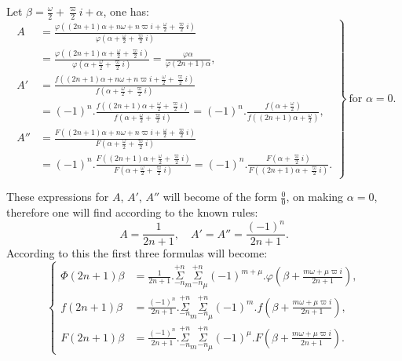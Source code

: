 \documentclass{article}
\begin{document}

Let $\beta=\frac{\omega}{2}+\frac{\varpi}{2}i+\alpha$, one has:
\[ \left.\begin{aligned}
A&=\frac{\varphi\left((2n+1)\alpha+n\omega+n\varpi i+\frac{\omega}{2}+\frac{\varpi}{2}i\right)}{\varphi\left(\alpha+\frac{\omega}{2}+\frac{\varpi}{2}i\right)}\\
&=\frac{\varphi\left((2n+1)\alpha+\frac{\omega}{2}+\frac{\varpi}{2}i\right)}{\varphi\left(\alpha+\frac{\omega}{2}+\frac{\varpi}{2}i\right)}=\frac{\varphi\alpha}{\varphi(2n+1)\alpha},\\
A'&=\frac{f\left((2n+1)\alpha+n\omega+n\varpi i+\frac{\omega}{2}+\frac{\varpi}{2}i\right)}{f\left(\alpha+\frac{\omega}{2}+\frac{\varpi}{2}i\right)}\\
&=(-1)^{n}.\frac{f\left((2n+1)\alpha+\frac{\omega}{2}+\frac{\varpi}{2}i\right)}{f\left(\alpha+\frac{\omega}{2}+\frac{\varpi}{2}i\right)}=(-1)^{n}.\frac{f\left(\alpha+\frac{\omega}{2}\right)}{f\left((2n+1)\alpha+\frac{\omega}{2}\right)},\\
A''&=\frac{F\left((2n+1)\alpha+n\omega+n\varpi i+\frac{\omega}{2}+\frac{\varpi}{2}i\right)}{F\left(\alpha+\frac{\omega}{2}+\frac{\varpi}{2}i\right)}\\
&=(-1)^{n}.\frac{F\left((2n+1)\alpha+\frac{\omega}{2}+\frac{\varpi}{2}i\right)}{F\left(\alpha+\frac{\omega}{2}+\frac{\varpi}{2}i\right)}=(-1)^{n}.\frac{F\left(\alpha+\frac{\varpi}{2}i\right)}{F\left((2n+1)\alpha+\frac{\varpi}{2}i\right)}.
\end{aligned}\right\}\ \text{for }\alpha=0. \]

These expressions for $A$, $A'$, $A''$ will become of the form $\frac{0}{0}$, on making $\alpha=0$, therefore one will find according to the known rules:
\[ A=\frac{1}{2n+1},\quad A'=A''=\frac{(-1)^{n}}{2n+1}. \]
According to this the first three formulas will become:
\[ \left\{\begin{aligned}
\Phi(2n+1)\beta&=\frac{1}{2n+1}.\overset{+n}{\underset{-n}{\Sigma}}_{m}\overset{+n}{\underset{-n}{\Sigma}}_{\mu}(-1)^{m+\mu}.\varphi\left(\beta+\frac{m\omega+\mu\varpi i}{2n+1}\right),\\
f(2n+1)\beta&=\frac{(-1)^{n}}{2n+1}.\overset{+n}{\underset{-n}{\Sigma}}_{m}\overset{+n}{\underset{-n}{\Sigma}}_{\mu}(-1)^{m}.f\left(\beta+\frac{m\omega+\mu\varpi i}{2n+1}\right),\\
F(2n+1)\beta&=\frac{(-1)^{n}}{2n+1}.\overset{+n}{\underset{-n}{\Sigma}}_{m}\overset{+n}{\underset{-n}{\Sigma}}_{\mu}(-1)^{\mu}.F\left(\beta+\frac{m\omega+\mu\varpi i}{2n+1}\right).
\end{aligned}\right. \tag{126.} \]
\end{document}
